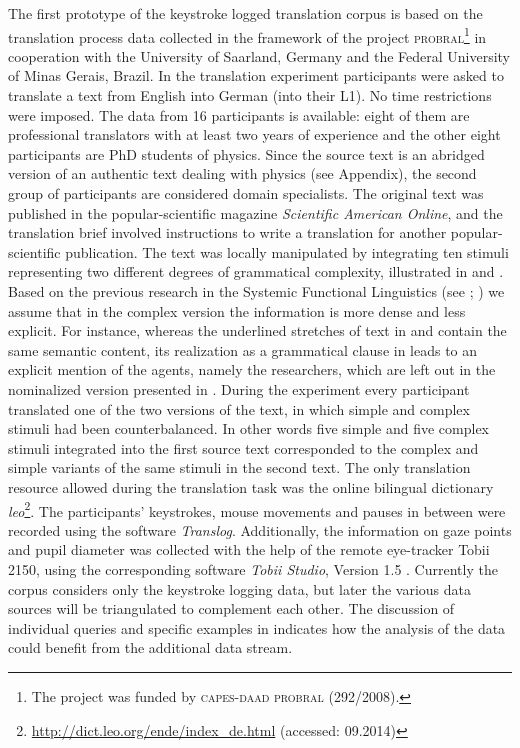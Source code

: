 \documentclass[output=paper]{LSP/langsci}
\begin{document}
The first prototype of the keystroke logged translation corpus is based on the translation process data collected in the framework of the project \textsc{probral}\footnote{The project was funded by \textsc{capes}-\textsc{daad} \textsc{probral} (292/2008).} in cooperation with the University of Saarland, Germany and the Federal University of Minas Gerais, Brazil. In the translation experiment participants were asked to translate a text from English into German (into their L1). No time restrictions were imposed. The data from 16 participants is available: eight of them are professional translators with at least two years of experience and the other eight participants are PhD students of physics. Since the source text is an abridged version of an authentic text dealing with physics (see Appendix), the second group of participants are considered domain specialists. The original text was published in the popular-scientific magazine \textit{Scientific American Online}, and the translation brief involved instructions to write a translation for another popular-scientific publication. The text was locally manipulated by integrating ten stimuli representing two different degrees of grammatical complexity, illustrated in  and . Based on the previous research in the Systemic Functional Linguistics (see \citealt[715]{Halliday2014}; \citealt[8--10]{Taverniers2003}) we assume that in the complex version the information is more dense and less explicit. For instance, whereas the underlined stretches of text in  and  contain the same semantic content, its realization as a grammatical clause in  leads to an explicit mention of the agents, namely the researchers, which are left out in the nominalized version presented in . During the experiment every participant translated one of the two versions of the text, in which simple and complex stimuli had been counterbalanced. In other words five simple and five complex stimuli integrated into the first source text corresponded to the complex and simple variants of the same stimuli in the second text. The only translation resource allowed during the translation task was the online bilingual dictionary \textit{leo}\footnote{\url{http://dict.leo.org/ende/index_de.html} (accessed: 09.2014)}. The participants’ keystrokes, mouse movements and pauses in between were recorded using the software \textit{Translog}. Additionally, the information on gaze points and pupil diameter was collected with the help of the remote eye-tracker Tobii 2150, using the corresponding software \textit{Tobii Studio}, Version 1.5 \citep{Tobii2008}. Currently the corpus considers only the keystroke logging data, but later the various data sources will be triangulated \citep[see][]{Alves2003} to complement each other. The discussion of individual queries and specific examples in  indicates how the analysis of the data could benefit from the additional data stream. 
\end{document}
